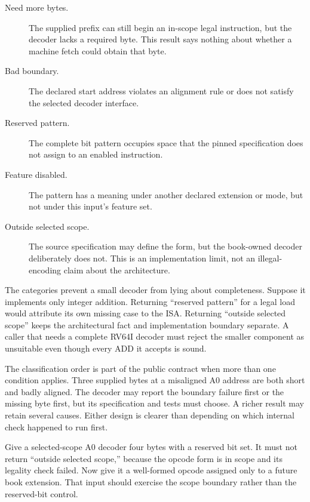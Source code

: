\begin{description}
\item[Need more bytes.] The supplied prefix can still begin an in-scope legal
instruction, but the decoder lacks a required byte. This result says nothing
about whether a machine fetch could obtain that byte.
\item[Bad boundary.] The declared start address violates an alignment rule or
does not satisfy the selected decoder interface.
\item[Reserved pattern.] The complete bit pattern occupies space that the
pinned specification does not assign to an enabled instruction.
\item[Feature disabled.] The pattern has a meaning under another declared
extension or mode, but not under this input's feature set.
\item[Outside selected scope.] The source specification may define the form,
but the book-owned decoder deliberately does not. This is an implementation
limit, not an illegal-encoding claim about the architecture.
\end{description}

The categories prevent a small decoder from lying about completeness. Suppose
it implements only integer addition. Returning ``reserved pattern'' for a
legal load would attribute its own missing case to the ISA. Returning
``outside selected scope'' keeps the architectural fact and implementation
boundary separate. A caller that needs a complete RV64I decoder must reject
the smaller component as unsuitable even though every ADD it accepts is
sound.

The classification order is part of the public contract when more than one
condition applies. Three supplied bytes at a misaligned A0 address are both
short and badly aligned. The decoder may report the boundary failure first or
the missing byte first, but its specification and tests must choose. A richer
result may retain several causes. Either design is clearer than depending on
which internal check happened to run first.

\begin{tryit}[title={A rejection result can itself be wrong}]
Give a selected-scope A0 decoder four bytes with a reserved bit set. It must
not return ``outside selected scope,'' because the opcode form is in scope and
its legality check failed. Now give it a well-formed opcode assigned only to a
future book extension. That input should exercise the scope boundary rather
than the reserved-bit control.
\end{tryit}

